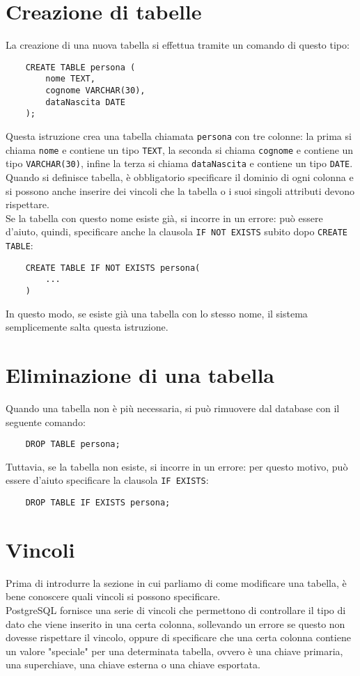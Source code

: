 \documentclass[12pt,a4paper]{book}
\begin{document}
	\section{Creazione di tabelle}
	La creazione di una nuova tabella si effettua tramite un comando di questo tipo:
	\begin{lstlisting}
	CREATE TABLE persona (
		nome TEXT,
		cognome VARCHAR(30),
		dataNascita DATE
	);
	\end{lstlisting}
	Questa istruzione crea una tabella chiamata \texttt{persona} con tre colonne: la prima si chiama \texttt{nome} e contiene un tipo \texttt{TEXT}, la seconda si chiama \texttt{cognome} e contiene un tipo \texttt{VARCHAR(30)}, infine la terza si chiama \texttt{dataNascita} e contiene un tipo \texttt{DATE}.\\Quando si definisce tabella, è obbligatorio specificare il dominio di ogni colonna e si possono anche inserire dei vincoli che la tabella o i suoi singoli attributi devono rispettare.\\Se la tabella con questo nome esiste già, si incorre in un errore: può essere d'aiuto, quindi, specificare anche la clausola \texttt{IF NOT EXISTS} subito dopo \texttt{CREATE TABLE}:
	\begin{lstlisting}
	CREATE TABLE IF NOT EXISTS persona(
		...
	)
	\end{lstlisting}
	In questo modo, se esiste già una tabella con lo stesso nome, il sistema semplicemente salta questa istruzione.
	\section{Eliminazione di una tabella}
	Quando una tabella non è più necessaria, si può rimuovere dal database con il seguente comando:
	\begin{lstlisting}
	DROP TABLE persona;
	\end{lstlisting}
	Tuttavia, se la tabella non esiste, si incorre in un errore: per questo motivo, può essere d'aiuto specificare la clausola \texttt{IF EXISTS}:
	\begin{lstlisting}
	DROP TABLE IF EXISTS persona;
	\end{lstlisting} 
	\section{Vincoli}
	Prima di introdurre la sezione in cui parliamo di come modificare una tabella, è bene conoscere quali vincoli si possono specificare.\\
	PostgreSQL fornisce una serie di vincoli che permettono di controllare il tipo di dato che viene inserito in una certa colonna, sollevando un errore se questo non dovesse rispettare il vincolo, oppure di specificare che una certa colonna contiene un valore "speciale" per una determinata tabella, ovvero è una chiave primaria, una superchiave, una chiave esterna o una chiave esportata.
\end{document}
